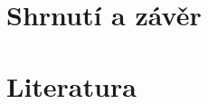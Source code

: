 \documentclass[12pt,oneside]{book} %
\begin{document}
\part{Shrnutí a závěr}\label{shrnuti}

\part{Literatura}\label{literatura}
\end{document}
